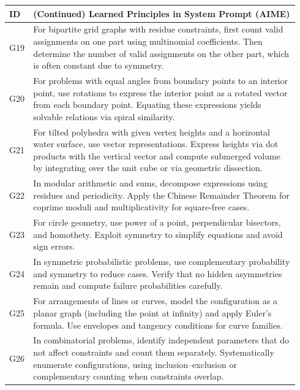\documentclass{article}
\theoremstyle{plain}
\theoremstyle{definition}
\theoremstyle{remark}
\begin{document}
\begin{table}[h]
\centering
\small
\setlength{\tabcolsep}{6pt}
\renewcommand{\arraystretch}{1.4}
\begin{tabular}{p{0.04\linewidth} p{0.9\linewidth}}
\toprule
\textbf{ID} & \textbf{(Continued) Learned Principles in System Prompt (AIME)} \\
\midrule
G19 & For bipartite grid graphs with residue constraints, first count valid assignments on one part using multinomial coefficients. Then determine the number of valid assignments on the other part, which is often constant due to symmetry. \\

G20 & For problems with equal angles from boundary points to an interior point, use rotations to express the interior point as a rotated vector from each boundary point. Equating these expressions yields solvable relations via spiral similarity. \\

G21 & For tilted polyhedra with given vertex heights and a horizontal water surface, use vector representations. Express heights via dot products with the vertical vector and compute submerged volume by integrating over the unit cube or via geometric dissection. \\

G22 & In modular arithmetic and sums, decompose expressions using residues and periodicity. Apply the Chinese Remainder Theorem for coprime moduli and multiplicativity for square-free cases. \\

G23 & For circle geometry, use power of a point, perpendicular bisectors, and homothety. Exploit symmetry to simplify equations and avoid sign errors. \\

G24 & In symmetric probabilistic problems, use complementary probability and symmetry to reduce cases. Verify that no hidden asymmetries remain and compute failure probabilities carefully. \\

G25 & For arrangements of lines or curves, model the configuration as a planar graph (including the point at infinity) and apply Euler’s formula. Use envelopes and tangency conditions for curve families. \\

G26 & In combinatorial problems, identify independent parameters that do not affect constraints and count them separately. Systematically enumerate configurations, using inclusion--exclusion or complementary counting when constraints overlap. \\
\bottomrule
\end{tabular}
\end{table}
\end{document}
